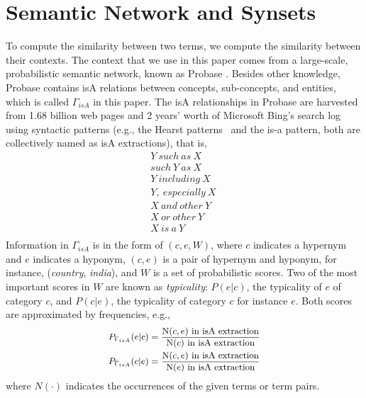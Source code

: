 \section{Semantic Network and Synsets}
\label{sec:knowledge}

To compute the similarity between two terms, we compute the similarity
between their contexts. The context that we use in this paper comes from a
large-scale, probabilistic semantic network, known as Probase
\cite{12MSRA:Probase}. Besides other knowledge, Probase contains isA
relations between concepts, sub-concepts, and entities, which is called
$\Gamma_{isA}$ in this paper.
The isA relationships in Probase are harvested from 1.68 billion web
 pages and 2 years' worth of Microsoft Bing's search log using syntactic patterns
(e.g., the Hearst patterns~\cite{Hearst:Automatic} and the is-a pattern, both are collectively named as isA extractions), that is,
\begin{displaymath}
\begin{aligned}
Y~such~as~X\\
such~Y~as~X\\
Y~including~X\\
Y,~especially~X~\\
X~and~other~Y\\
X~or~other~Y\\
X~is~a~Y\\
\end{aligned}
\end{displaymath}
Information in $\Gamma_{isA}$ is in the form of $(c, e, W)$, where $c$ indicates a hypernym and $e$ indicates a hyponym, $(c,e)$ is a pair of hypernym and hyponym, for instance, ({\it country}, {\it india}), and $W$ is a set of
probabilistic scores. Two of the most important scores in $W$ are
known as {\it typicality}: $P(e|c)$, the typicality of $e$ of category
$c$, and $P(c|e)$, the typicality of category $c$ for instance $e$. Both scores are
approximated by frequencies, e.g.,
\begin{displaymath}
\small{
\begin{aligned}
P_{\Gamma_{isA}}(e|c) = \frac{\mbox{N}(c,e)\mbox{ in isA extraction}}{\mbox{N}(c)\mbox{ in isA extraction}}\\
P_{\Gamma_{isA}}(c|e) = \frac{\mbox{N}(c,e)\mbox{ in isA extraction}}{\mbox{N}(e)\mbox{ in isA extraction}}
\end{aligned}
}
\end{displaymath}
where $N(\cdot)$ indicates the occurrences of the given terms or term pairs.

